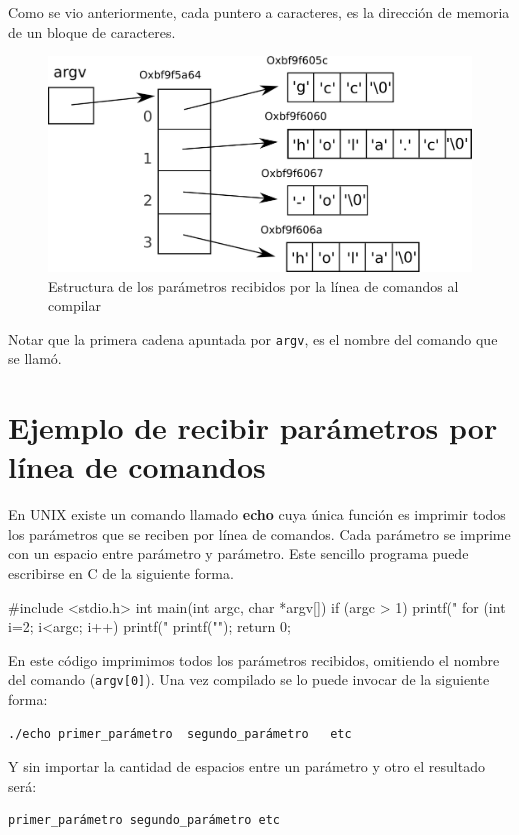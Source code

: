 Como se vio anteriormente, cada puntero a caracteres, es la dirección de
memoria de un bloque de caracteres.

\begin{figure}[htb]
\centering
\includegraphics{imagenes/parametros}
\caption{Estructura de los parámetros recibidos por la línea de comandos
al compilar}
\end{figure}

Notar que la primera cadena apuntada por \lstinline!argv!, es el nombre del
comando que se llamó.

\section{Ejemplo de recibir parámetros por línea de comandos}

En UNIX existe un comando llamado \textbf{echo} cuya única función es imprimir todos
los parámetros que se reciben por línea de comandos. Cada parámetro se imprime
con un espacio entre parámetro y parámetro. Este sencillo programa puede
escribirse en C de la siguiente forma.

\begin{codigo-c}
#include <stdio.h>
int main(int argc, char *argv[])
{
    if (argc > 1) {
        printf("%
    }
    for (int i=2; i<argc; i++) {
        printf(" %
    }
    printf("\n");
    return 0;
}
\end{codigo-c}

En este código imprimimos todos los parámetros recibidos, omitiendo el
nombre del comando (\lstinline!argv[0]!).
Una vez compilado se lo puede invocar de la siguiente forma:
    
\begin{verbatim} 
./echo primer_parámetro  segundo_parámetro   etc
\end{verbatim} 

Y sin importar la cantidad de espacios entre un parámetro y otro el resultado
será: 

\begin{verbatim} 
primer_parámetro segundo_parámetro etc
\end{verbatim}

